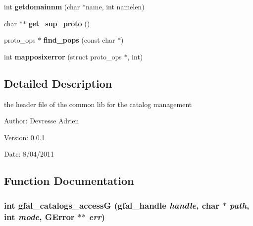 \begin{CompactItemize}
\item 
int \textbf{getdomainnm} (char $\ast$name, int namelen)\label{gfal__common__catalog_8h_446a829e4f333d3a0364ab0f2b5a2dc7}

\item 
char $\ast$$\ast$ \textbf{get\_\-sup\_\-proto} ()\label{gfal__common__catalog_8h_03347619db3b30ef54ae6a98e351e21f}

\item 
proto\_\-ops $\ast$ \textbf{find\_\-pops} (const char $\ast$)\label{gfal__common__catalog_8h_40d4c392e45e16062bc90caf0ebfa436}

\item 
int \textbf{mapposixerror} (struct proto\_\-ops $\ast$, int)\label{gfal__common__catalog_8h_c8360922877ec368815d412209e862a2}

\end{CompactItemize}


\subsection{Detailed Description}
the header file of the common lib for the catalog management 

\begin{Desc}
\item[Author:]Devresse Adrien \end{Desc}
\begin{Desc}
\item[Version:]0.0.1 \end{Desc}
\begin{Desc}
\item[Date:]8/04/2011 \end{Desc}


\subsection{Function Documentation}
\subsubsection{\setlength{\rightskip}{0pt plus 5cm}int gfal\_\-catalogs\_\-access\-G (gfal\_\-handle {\em handle}, char $\ast$ {\em path}, int {\em mode}, GError $\ast$$\ast$ {\em err})}\label{gfal__common__catalog_8h_c0a73bbac2867b3dd9c107f74114e8a6}


